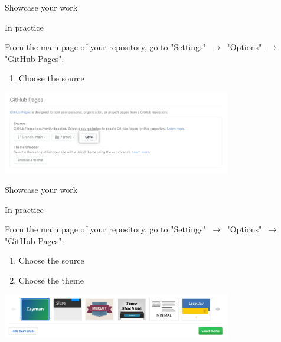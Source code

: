 \begin{frame}{Showcase your work}

In practice

From the main page of your repository, go to "Settings" $\,\to\,$ "Options" $\,\to\,$ "GitHub Pages".

\begin{enumerate}
    \item Choose the source
\end{enumerate}

\begin{center}
    \includegraphics[width=10cm]{08_sharing/images/github_pages_settings_save.png}
\end{center}

\end{frame}

\begin{frame}{Showcase your work}

In practice

From the main page of your repository, go to "Settings" $\,\to\,$ "Options" $\,\to\,$ "GitHub Pages".

\begin{enumerate}
    \item Choose the source
    \item Choose the theme
\end{enumerate}

\begin{center}
    \includegraphics[width=10cm]{08_sharing/images/github_pages_settings_theme.png}
\end{center}

\end{frame}

